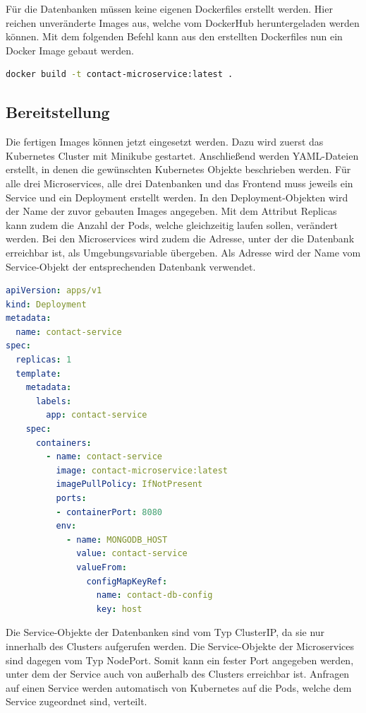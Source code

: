 Für die Datenbanken müssen keine eigenen Dockerfiles erstellt werden. Hier reichen unveränderte Images aus, welche vom DockerHub heruntergeladen werden können. Mit dem folgenden Befehl kann aus den erstellten Dockerfiles nun ein Docker Image gebaut werden.

\begin{lstlisting}[language=bash, caption=Docker-Befehl für das Bauen eines Images, captionpos=b]
docker build -t contact-microservice:latest .
\end{lstlisting}

\subsection{Bereitstellung}

Die fertigen Images können jetzt eingesetzt werden. Dazu wird zuerst das Kubernetes Cluster mit Minikube gestartet. Anschließend werden YAML-Dateien erstellt, in denen die gewünschten Kubernetes Objekte beschrieben werden. Für alle drei Microservices, alle drei Datenbanken und das Frontend muss jeweils ein Service und ein Deployment erstellt werden. In den Deployment-Objekten wird der Name der zuvor gebauten Images angegeben. Mit dem Attribut Replicas kann zudem die Anzahl der Pods, welche gleichzeitig laufen sollen, verändert werden. Bei den Microservices wird zudem die Adresse, unter der die Datenbank erreichbar ist, als Umgebungsvariable übergeben. Als Adresse wird der Name vom Service-Objekt der entsprechenden Datenbank verwendet.

\begin{lstlisting}[language=YAML, caption=Deployment-Objekt vom Kontakt-Microservice]
apiVersion: apps/v1
kind: Deployment
metadata:
  name: contact-service
spec:
  replicas: 1
  template:
    metadata:
      labels:
        app: contact-service
    spec:
      containers:
        - name: contact-service
          image: contact-microservice:latest
          imagePullPolicy: IfNotPresent
          ports:
          - containerPort: 8080
          env:
            - name: MONGODB_HOST
              value: contact-service
              valueFrom:
                configMapKeyRef:
                  name: contact-db-config  
                  key: host
\end{lstlisting}

Die Service-Objekte der Datenbanken sind vom Typ ClusterIP, da sie nur innerhalb des Clusters aufgerufen werden.
Die Service-Objekte der Microservices sind dagegen vom Typ NodePort. Somit kann ein fester Port angegeben werden, unter dem der Service auch von außerhalb des Clusters erreichbar ist. Anfragen auf einen Service werden automatisch von Kubernetes auf die Pods, welche dem Service zugeordnet sind, verteilt. 

